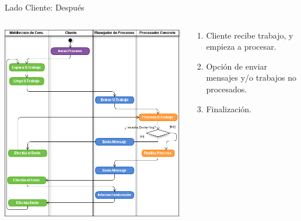 \begin{frame}{Lado Cliente: Después}
    \begin{columns}[T]
        \begin{column}{.6\textwidth}
            \centering
            \includegraphics[scale=0.3]{images/ActivityFuDClient-Duplex.png}
        \end{column}
        \begin{column}{.4\textwidth}
            \begin{enumerate}
                \item   Cliente recibe trabajo, y empieza a procesar.
                \vspace{0.2cm}
                \item   Opción de enviar mensajes y/o trabajos no procesados.
                \vspace{0.2cm}
                \item   Finalización.
            \end{enumerate}
        \end{column}
    \end{columns}
\end{frame}

